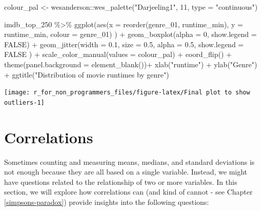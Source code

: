 \documentclass[
]{book}
\newenvironment{Shaded}{\begin{snugshade}}{\end{snugshade}}
\newcommand{\AttributeTok}[1]{\textcolor[rgb]{0.77,0.63,0.00}{#1}}
\newcommand{\ConstantTok}[1]{\textcolor[rgb]{0.00,0.00,0.00}{#1}}
\newcommand{\DecValTok}[1]{\textcolor[rgb]{0.00,0.00,0.81}{#1}}
\newcommand{\FloatTok}[1]{\textcolor[rgb]{0.00,0.00,0.81}{#1}}
\newcommand{\FunctionTok}[1]{\textcolor[rgb]{0.00,0.00,0.00}{#1}}
\newcommand{\NormalTok}[1]{#1}
\newcommand{\OtherTok}[1]{\textcolor[rgb]{0.56,0.35,0.01}{#1}}
\newcommand{\SpecialCharTok}[1]{\textcolor[rgb]{0.00,0.00,0.00}{#1}}
\newcommand{\StringTok}[1]{\textcolor[rgb]{0.31,0.60,0.02}{#1}}
\begin{document}
\begin{Shaded}
\begin{Highlighting}[]
\NormalTok{colour\_pal }\OtherTok{\textless{}{-}}\NormalTok{ wesanderson}\SpecialCharTok{::}\FunctionTok{wes\_palette}\NormalTok{(}\StringTok{"Darjeeling1"}\NormalTok{, }\DecValTok{11}\NormalTok{, }\AttributeTok{type =} \StringTok{"continuous"}\NormalTok{)}

\NormalTok{imdb\_top\_250 }\SpecialCharTok{\%\textgreater{}\%} 
  \FunctionTok{ggplot}\NormalTok{(}\FunctionTok{aes}\NormalTok{(}\AttributeTok{x =} \FunctionTok{reorder}\NormalTok{(genre\_01, runtime\_min),}
             \AttributeTok{y =}\NormalTok{ runtime\_min,}
             \AttributeTok{colour =}\NormalTok{ genre\_01)}
\NormalTok{         ) }\SpecialCharTok{+}
  \FunctionTok{geom\_boxplot}\NormalTok{(}\AttributeTok{alpha =} \DecValTok{0}\NormalTok{,}
               \AttributeTok{show.legend =} \ConstantTok{FALSE}\NormalTok{) }\SpecialCharTok{+}
  \FunctionTok{geom\_jitter}\NormalTok{(}\AttributeTok{width =} \FloatTok{0.1}\NormalTok{,}
              \AttributeTok{size =} \FloatTok{0.5}\NormalTok{,}
              \AttributeTok{alpha =} \FloatTok{0.5}\NormalTok{,}
              \AttributeTok{show.legend =} \ConstantTok{FALSE}
\NormalTok{              ) }\SpecialCharTok{+}
  \FunctionTok{scale\_color\_manual}\NormalTok{(}\AttributeTok{values =}\NormalTok{ colour\_pal) }\SpecialCharTok{+}
  \FunctionTok{coord\_flip}\NormalTok{() }\SpecialCharTok{+}
  \FunctionTok{theme}\NormalTok{(}\AttributeTok{panel.background =} \FunctionTok{element\_blank}\NormalTok{())}\SpecialCharTok{+}
  \FunctionTok{xlab}\NormalTok{(}\StringTok{"runtime"}\NormalTok{) }\SpecialCharTok{+}
  \FunctionTok{ylab}\NormalTok{(}\StringTok{"Genre"}\NormalTok{) }\SpecialCharTok{+}
  \FunctionTok{ggtitle}\NormalTok{(}\StringTok{"Distribution of movie runtimes by genre"}\NormalTok{)}
\end{Highlighting}
\end{Shaded}

\begin{center}\texttt{[image: r\_for\_non\_programmers\_files/figure-latex/Final plot to show outliers-1]} \end{center}

\hypertarget{correlations}{%
\chapter{Correlations}\label{correlations}}

Sometimes counting and measuring means, medians, and standard deviations is not enough because they are all based on a single variable. Instead, we might have questions related to the relationship of two or more variables. In this section, we will explore how correlations can (and kind of cannot - see Chapter \ref{simpsons-paradox}) provide insights into the following questions:
\end{document}
